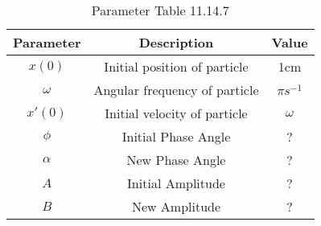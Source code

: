 
\begin{table}[h]
  \centering
  \begin{tabular}{|c|c|c|}
    \hline
Parameter & Description & Value \\ \hline
$x(0)$ & Initial position of particle & 1cm\\ \hline
$\omega$ & Angular frequency of particle & $\pi s^{-1}$ \\ \hline
$x'(0)$ & Initial velocity of particle & $\omega$ \\ \hline
$\phi$ & Initial Phase Angle & ?\\
\hline
$\alpha$ & New Phase Angle & ?\\
\hline
$A$ & Initial Amplitude & ?\\
\hline
$B$ & New Amplitude & ?\\
\hline
  \end{tabular}
  \vspace{2mm}
  \caption{Parameter Table 11.14.7}
\end{table}


